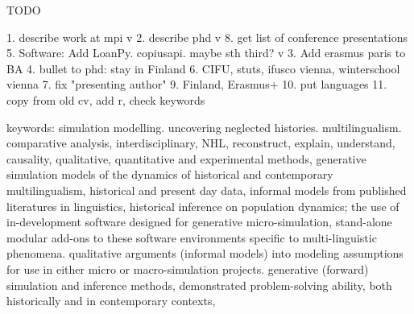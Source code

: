 TODO

1. describe work at mpi v
2. describe phd v
8. get list of conference presentations
5. Software: Add LoanPy. copiusapi. maybe sth third? v
3. Add erasmus paris to BA
4. bullet to phd: stay in Finland
6. CIFU, stuts, ifusco vienna, winterschool vienna
7. fix "presenting author"
9. Finland, Erasmus+
10. put languages
11. copy from old cv, add r, check keywords


keywords: simulation modelling. uncovering neglected histories. multilingualism. comparative analysis, interdisciplinary, NHL, reconstruct, explain, understand, causality, qualitative, quantitative and experimental methods, generative simulation models of the dynamics of historical and contemporary multilingualism, historical and present day data, informal models from published literatures in linguistics, historical inference on population dynamics; the use of in-development software designed for generative micro-simulation, stand-alone modular add-ons to these software environments specific to multi-linguistic phenomena. qualitative arguments (informal models) into modeling assumptions for use in either micro or macro-simulation projects. generative (forward) simulation and inference methods, demonstrated problem-solving ability, both historically and in contemporary contexts,

\\
\begin{cvpubs}
\end{cvpubs}

\begin{cvpubs}
\end{cvpubs}

\begin{cvpubs}
\end{cvpubs}

\begin{cvpubs}
\end{cvpubs}

\begin{cvpubs}
\end{cvpubs}

\begin{cvpubs}
\end{cvpubs}

\begin{cvpubs}
\end{cvpubs}

